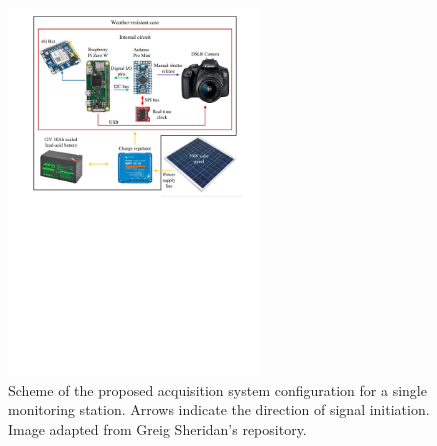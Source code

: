 \begin{figure}[ht!]
  \centering
  \includegraphics[width=0.6\textwidth]{schema.pdf}
  \caption{Scheme of the proposed acquisition system configuration for a single
    monitoring station. Arrows indicate the direction of signal initiation. Image adapted
    from Greig Sheridan's repository.}
  \label{fig:4:scheme_foto}
\end{figure}


